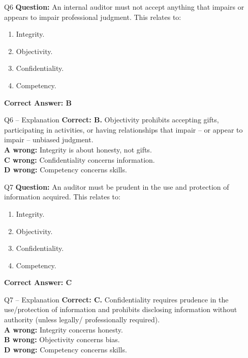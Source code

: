 \documentclass[aspectratio=169,10pt]{beamer}
\begin{document}
	\begin{frame}[t]{Q6}
		\small
		\textbf{Question:} An internal auditor must not accept anything that impairs or appears to impair professional judgment. This relates to:
		\begin{enumerate}[label=\Alph*.,itemsep=1pt,topsep=2pt]
			\item Integrity.
			\item Objectivity.
			\item Confidentiality.
			\item Competency.
		\end{enumerate}
		\vspace{4pt}
		\textbf{Correct Answer: B}
	\end{frame}
	
	\begin{frame}[t]{Q6 -- Explanation}
		\small
		\textbf{Correct: B.} Objectivity prohibits accepting gifts, participating in activities, or having relationships that impair -- or appear to impair -- unbiased judgment. \\[4pt]
		\textbf{A wrong:} Integrity is about honesty, not gifts. \\[2pt]
		\textbf{C wrong:} Confidentiality concerns information. \\[2pt]
		\textbf{D wrong:} Competency concerns skills.
	\end{frame}
	
	\begin{frame}[t]{Q7}
		\small
		\textbf{Question:} An auditor must be prudent in the use and protection of information acquired. This relates to:
		\begin{enumerate}[label=\Alph*.,itemsep=1pt,topsep=2pt]
			\item Integrity.
			\item Objectivity.
			\item Confidentiality.
			\item Competency.
		\end{enumerate}
		\vspace{4pt}
		\textbf{Correct Answer: C}
	\end{frame}
	
	\begin{frame}[t]{Q7 -- Explanation}
		\small
		\textbf{Correct: C.} Confidentiality requires prudence in the use/protection of information and prohibits disclosing information without authority (unless legally/ professionally required). \\[4pt]
		\textbf{A wrong:} Integrity concerns honesty. \\[2pt]
		\textbf{B wrong:} Objectivity concerns bias. \\[2pt]
		\textbf{D wrong:} Competency concerns skills.
	\end{frame}
	
\end{document}
